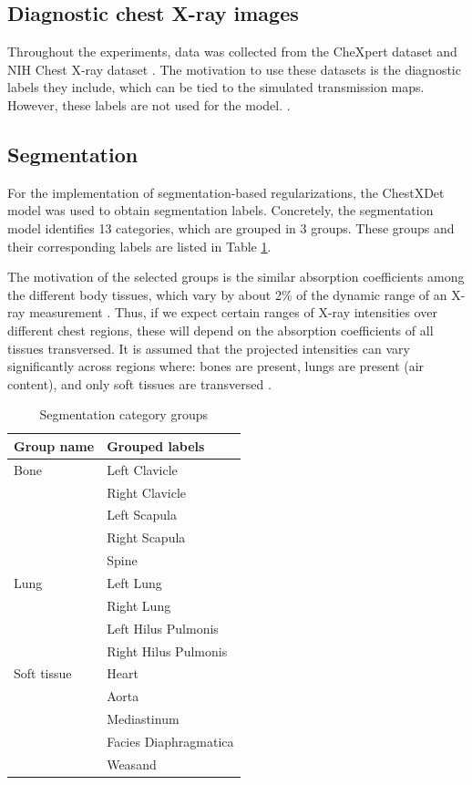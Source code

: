 \documentclass[nomenclature, english, bibtex]{kththesis}
\numberwithin{listing}{chapter}
\begin{document}
\subsection{Diagnostic chest X-ray images}

Throughout the experiments, data was collected from the CheXpert dataset
\cite{chexpert} and NIH Chest X-ray dataset \cite{nih}. The motivation to use these datasets is the diagnostic
labels they include, which can be tied to the simulated transmission maps. However, these labels are not used for
the model. .

\subsection{Segmentation}

For the implementation of segmentation-based regularizations,
the ChestXDet \cite{chestxdet} model was used to obtain segmentation
labels. Concretely, the segmentation model identifies 13 categories, which are grouped in 3 groups. These groups and their corresponding
labels are listed in Table \ref{tab:segmentationGroups}.

The motivation of the selected groups is the similar absorption coefficients among the different body tissues, which
vary by about 2\% of the dynamic range of an X-ray measurement  \cite[p.~54]{epstein2008}.
Thus, if we expect certain ranges of X-ray intensities over different chest regions, these will depend on the absorption coefficients of all tissues transversed.
It is assumed that the projected intensities can vary significantly across regions where: bones are present, lungs are present (air content), and only soft tissues are transversed .

\begin{table}[H]
    \centering
    \begin{tabular}{l l}
        \textbf{Group name} & \textbf{Grouped labels} \\
        \hline
        Bone &  Left Clavicle\\
            & Right Clavicle \\
            & Left Scapula\\
            &Right Scapula\\
            &Spine \\
        \hline
        Lung &  Left Lung \\
            & Right Lung \\
            & Left Hilus Pulmonis \\
            & Right Hilus Pulmonis \\
        \hline
        Soft tissue &  Heart \\
        & Aorta \\
        & Mediastinum \\
        & Facies Diaphragmatica \\
        & Weasand
    \end{tabular}
    \caption{Segmentation category groups}
    \label{tab:segmentationGroups}
\end{table}
\end{document}
